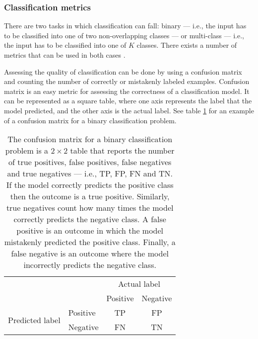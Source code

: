             \subsubsection{Classification metrics}
                There are two tasks in which classification can fall: binary --- i.e., the input has to be classified into one of two non-overlapping classes --- or multi-class --- i.e., the input has to be classified into one of \(K\) classes. There exists a number of metrics that can be used in both cases \cite{Sokolova}.
                
                Assessing the quality of classification can be done by using a confusion matrix and counting the number of correctly or mistakenly labeled examples. Confusion matrix is an easy metric for assessing the correctness of a classification model. It can be represented as a square table, where one axis represents the label that the model predicted, and the other axis is the actual label. See table \ref{confusion_matrix} for an example of a confusion matrix for a binary classification problem.
                
                \begin{table}
                    \centering
                    \renewcommand{\arraystretch}{2}
                    \begin{tabular}{l|l|c|c|}
                        \multicolumn{2}{c}{} & \multicolumn{2}{c}{Actual label}\\
                        \cline{3-4}
                        \multicolumn{2}{c|}{}&Positive&Negative\\
                        \cline{2-4}
                        \multirow{2}{*}{Predicted label}& Positive & TP & FP\\
                        \cline{2-4}
                        & Negative & FN & TN \\
                        \cline{2-4}
                    \end{tabular}
                    \caption{The confusion matrix for a binary classification problem is a \(2 \times 2\) table that reports the number of true positives, false positives, false negatives and true negatives --- i.e., TP, FP, FN and TN. If the model correctly predicts the positive class then the outcome is a true positive. Similarly, true negatives count how many times the model correctly predicts the negative class. A false positive is an outcome in which the model mistakenly predicted the positive class. Finally, a false negative is an outcome where the model incorrectly predicts the negative class.}
                    \label{confusion_matrix}
                \end{table}
                

